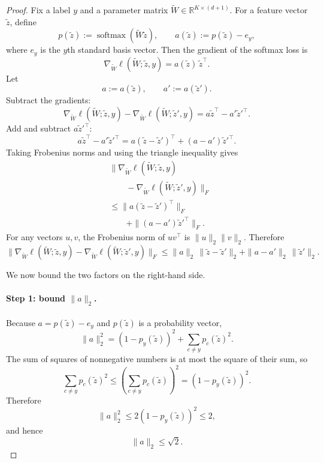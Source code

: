 \documentclass[conference,compsoc]{IEEEtran}
\DeclareMathOperator{\softmax}{softmax}
\begin{document}
\begin{proof}
Fix a label $y$ and a parameter matrix $\widetilde W\in\mathbb{R}^{K\times(d+1)}$. For a feature vector $\widetilde z$, define
\[
p(\widetilde z):=\softmax(\widetilde W\widetilde z),
\qquad
a(\widetilde z):=p(\widetilde z)-e_y,
\]
where $e_y$ is the $y$th standard basis vector. Then the gradient of the softmax loss is
\[
\nabla_{\widetilde W}\ell(\widetilde W;\widetilde z,y)
=
a(\widetilde z)\,\widetilde z^\top.
\]
Let
\[
a:=a(\widetilde z),
\qquad
a':=a(\widetilde z').
\]
Subtract the gradients:
\[
\nabla_{\widetilde W}\ell(\widetilde W;\widetilde z,y)
-
\nabla_{\widetilde W}\ell(\widetilde W;\widetilde z',y)
=
a\widetilde z^\top-a'\widetilde z'^\top.
\]
Add and subtract $a\widetilde z'^\top$:
\[
a\widetilde z^\top-a'\widetilde z'^\top
=
a(\widetilde z-\widetilde z')^\top+(a-a')\widetilde z'^\top.
\]
Taking Frobenius norms and using the triangle inequality gives
\[
\begin{aligned}
&\bigl\|
\nabla_{\widetilde W}\ell(\widetilde W;\widetilde z,y) \\
&\qquad -
\nabla_{\widetilde W}\ell(\widetilde W;\widetilde z',y)
\bigr\|_F \\
&\le
\|a(\widetilde z-\widetilde z')^\top\|_F \\
&\qquad +
\|(a-a')\widetilde z'^\top\|_F.
\end{aligned}
\]
For any vectors $u,v$, the Frobenius norm of $uv^\top$ is $\|u\|_2\|v\|_2$. Therefore
\begin{equation}
\label{eq:softmax-split}
\bigl\|
\nabla_{\widetilde W}\ell(\widetilde W;\widetilde z,y)
-
\nabla_{\widetilde W}\ell(\widetilde W;\widetilde z',y)
\bigr\|_F
\le
\|a\|_2\,\|\widetilde z-\widetilde z'\|_2
+
\|a-a'\|_2\,\|\widetilde z'\|_2.
\end{equation}

We now bound the two factors on the right-hand side.

\paragraph{Step 1: bound $\|a\|_2$.}
Because $a=p(\widetilde z)-e_y$ and $p(\widetilde z)$ is a probability vector,
\[
\|a\|_2^2
=
(1-p_y(\widetilde z))^2+\sum_{c\neq y}p_c(\widetilde z)^2.
\]
The sum of squares of nonnegative numbers is at most the square of their sum, so
\[
\sum_{c\neq y}p_c(\widetilde z)^2
\le
\left(\sum_{c\neq y}p_c(\widetilde z)\right)^2
=
(1-p_y(\widetilde z))^2.
\]
Therefore
\[
\|a\|_2^2
\le
2(1-p_y(\widetilde z))^2
\le
2,
\]
and hence
\begin{equation}
\label{eq:a-bound}
\|a\|_2\le \sqrt{2}.
\end{equation}


\end{proof}
\end{document}
